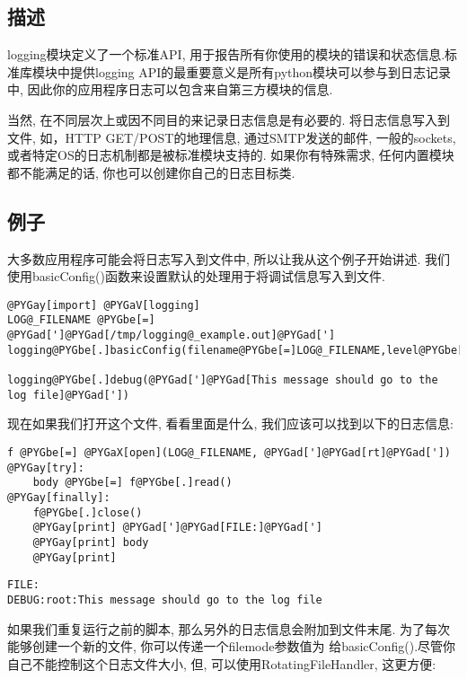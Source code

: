 \documentclass[a4paper,10pt,english]{manual}
\begin{document}
\subsection{描述}

logging模块定义了一个标准API, 用于报告所有你使用的模块的错误和状态信息.标准库模块中提供logging API的最重要意义是所有python模块可以参与到日志记录中, 因此你的应用程序日志可以包含来自第三方模块的信息.

当然, 在不同层次上或因不同目的来记录日志信息是有必要的. 将日志信息写入到文件, 如，HTTP GET/POST的地理信息, 通过SMTP发送的邮件, 一般的sockets, 或者特定OS的日志机制都是被标准模块支持的. 如果你有特殊需求, 任何内置模块都不能满足的话, 你也可以创建你自己的日志目标类.


\subsection{例子}

大多数应用程序可能会将日志写入到文件中, 所以让我从这个例子开始讲述. 我们使用basicConfig()函数来设置默认的处理用于将调试信息写入到文件.

\begin{Verbatim}[commandchars=@\[\]]
@PYGay[import] @PYGaV[logging]
LOG@_FILENAME @PYGbe[=] @PYGad[']@PYGad[/tmp/logging@_example.out]@PYGad[']
logging@PYGbe[.]basicConfig(filename@PYGbe[=]LOG@_FILENAME,level@PYGbe[=]logging@PYGbe[.]DEBUG,)

logging@PYGbe[.]debug(@PYGad[']@PYGad[This message should go to the log file]@PYGad['])
\end{Verbatim}

现在如果我们打开这个文件, 看看里面是什么, 我们应该可以找到以下的日志信息:

\begin{Verbatim}[commandchars=@\[\]]
f @PYGbe[=] @PYGaX[open](LOG@_FILENAME, @PYGad[']@PYGad[rt]@PYGad['])
@PYGay[try]:
    body @PYGbe[=] f@PYGbe[.]read()
@PYGay[finally]:
    f@PYGbe[.]close()
    @PYGay[print] @PYGad[']@PYGad[FILE:]@PYGad[']
    @PYGay[print] body
    @PYGay[print]
\end{Verbatim}

\begin{Verbatim}[commandchars=@\[\]]
FILE:
DEBUG:root:This message should go to the log file
\end{Verbatim}

如果我们重复运行之前的脚本, 那么另外的日志信息会附加到文件末尾. 为了每次能够创建一个新的文件, 你可以传递一个filemode参数值为  给basicConfig().尽管你自己不能控制这个日志文件大小, 但, 可以使用RotatingFileHandler, 这更方便:
\end{document}
